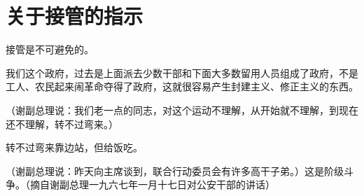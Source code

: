 \section[关于接管的指示（一九六七年一月）]{关于接管的指示}


接管是不可避免的。

我们这个政府，过去是上面派去少数干部和下面大多数留用人员组成了政府，不是工人、农民起来闹革命夺得了政府，这就很容易产生封建主义、修正主义的东西。

（谢副总理说：我们老一点的同志，对这个运动不理解，从开始就不理解，到现在还不理解，转不过弯来。）

转不过弯来靠边站，但给饭吃。

（谢副总理说：昨天向主席谈到，联合行动委员会有许多高干子弟。）这是阶级斗争。（摘自谢副总理一九六七年一月十七日对公安干部的讲话）


